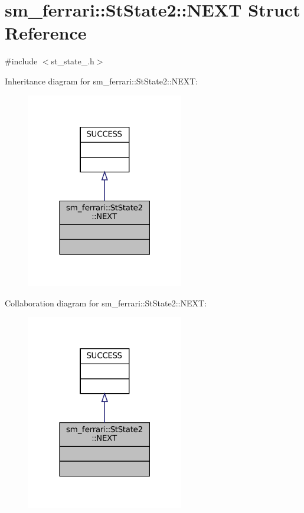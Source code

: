 \hypertarget{structsm__ferrari_1_1StState2_1_1NEXT}{}\section{sm\+\_\+ferrari\+:\+:St\+State2\+:\+:N\+E\+XT Struct Reference}
\label{structsm__ferrari_1_1StState2_1_1NEXT}


{\ttfamily \#include $<$st\+\_\+state\+\_.\+h$>$}



Inheritance diagram for sm\+\_\+ferrari\+:\+:St\+State2\+:\+:N\+E\+XT\+:
\nopagebreak
\begin{figure}[H]
\begin{center}
\leavevmode
\includegraphics[width=194pt]{structsm__ferrari_1_1StState2_1_1NEXT__inherit__graph}
\end{center}
\end{figure}


Collaboration diagram for sm\+\_\+ferrari\+:\+:St\+State2\+:\+:N\+E\+XT\+:
\nopagebreak
\begin{figure}[H]
\begin{center}
\leavevmode
\includegraphics[width=194pt]{structsm__ferrari_1_1StState2_1_1NEXT__coll__graph}
\end{center}
\end{figure}


